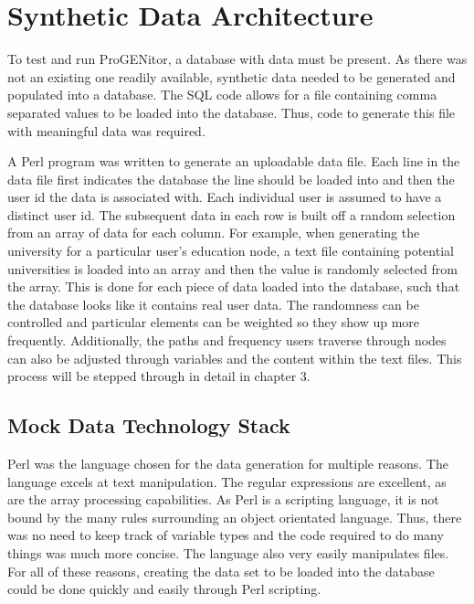 \section{Synthetic Data Architecture}
	To test and run ProGENitor, a database with data must be present.  As there was
not an existing one readily available, synthetic data needed to be generated and
populated into a database.  The SQL code allows for a file containing comma
separated values to be loaded into the database.  Thus, code to generate this
file with meaningful data was required.  
	
A Perl program was written to generate an uploadable data file.  Each line in
the data file first indicates the database the line should be loaded into and
then the user id the data is associated with.  Each individual user is assumed
to have a distinct user id.  The subsequent data in each row is built off a
random selection from an array of data for each column.  For example, when
generating the university for a particular user's education node, a text file
containing potential universities is loaded into an array and then the value is
randomly selected from the array.  This is done for each piece of data loaded
into the database, such  that the database looks like it contains real user
data.  The randomness can be controlled and particular elements can be weighted
so they show up more frequently.  Additionally, the paths and frequency users
traverse through nodes can also be adjusted through variables and the content
within the text files.  This process will be stepped through in detail in chapter 3.

\subsection{Mock Data Technology Stack}
Perl was the language chosen for the data generation for multiple reasons.  The
language excels at text manipulation.  The regular expressions are excellent, as
are the array processing capabilities.  As Perl is a scripting language, it is
not bound by the many rules surrounding an object orientated language.  Thus,
there was no need to keep track of variable types and the code required to do
many things was much more concise.  The language also very easily manipulates
files.  For all of these reasons, creating the data set to be loaded into the
database could be done quickly and easily through Perl scripting.
